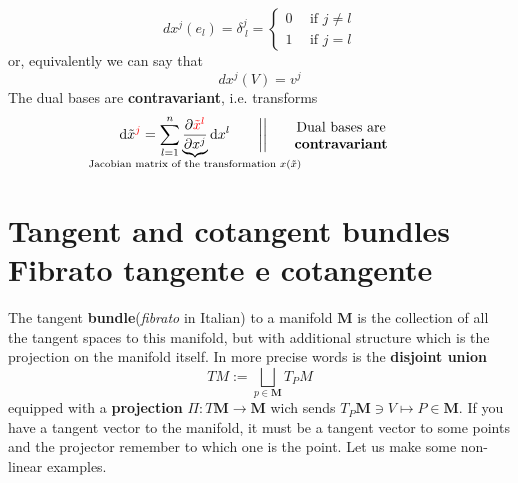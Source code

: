 \documentclass[../main.tex]{subfiles}
\begin{document}
\[
dx^j(e_l)=\delta^j_{\ l}=
\begin{cases}
0 \ & \ \textrm{if } j\neq l\\
1 \ & \ \textrm{if } j= l
\end{cases}
\]
or, equivalently we can say that
\[
dx^j(V)=v^j
\]
The dual bases are \textbf{contravariant}, i.e. transforms
\[
\textrm{d}\tilde{x}^{\textcolor{red}{j}}=\sum_{l=1}^n\underbrace{\frac{\partial \textcolor{red}{\tilde{x}^l}}{\partial{{x}^j}}}_{\mathclap{\text{Jacobian matrix of the transformation $x(\tilde{x})$}}}\textrm{d}x^l \qquad \bigg|\bigg| \quad \text{\parbox{3 cm}{\centering Dual bases are \textbf{contravariant}}}
\]
\section[Tangent and cotangent bundles]{Tangent and cotangent bundles\\\;\;\;\;Fibrato tangente e cotangente}
The tangent \textbf{bundle}(\textit{fibrato} in Italian) to a manifold $\mathbf{M}$ is the collection of all the tangent spaces to this manifold, but with additional structure which is the projection on the manifold itself. In more precise words is the \textbf{disjoint union}
\[
TM := \bigsqcup_{p\in\mathbf{M}}T_PM
\]
equipped with a \textbf{projection} $\Pi: T\mathbf{M}\to\mathbf{M}$ wich sends $T_P\mathbf{M}\ni V \mapsto P\in\mathbf{M}$. If you have a tangent vector to the manifold, it must be a tangent vector to some points and the projector remember to which one is the point. Let us make some non-linear examples.
\end{document}

